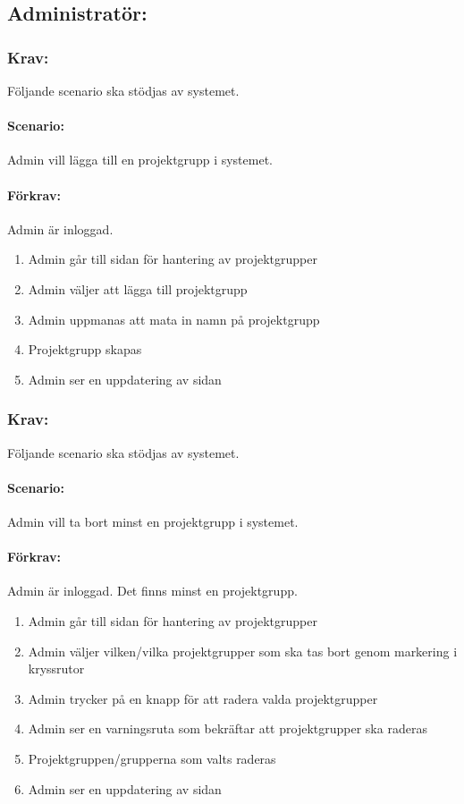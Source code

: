 \documentclass[paper=a4, fontsize=11pt,twoside]{article}
\begin{document}
\subsection{Administratör:}

\subsubsection{Krav:} Följande scenario ska stödjas av systemet.
\paragraph{Scenario:}
Admin vill lägga till en projektgrupp i systemet.
\paragraph{Förkrav:}
Admin är inloggad.
\begin{enumerate}
\item Admin går till sidan för hantering av projektgrupper
\item Admin väljer att lägga till projektgrupp
\item Admin uppmanas att mata in namn på projektgrupp
\item Projektgrupp skapas
\item Admin ser en uppdatering av sidan
\end{enumerate}

\subsubsection{Krav:} 
Följande scenario ska stödjas av systemet.
\paragraph{Scenario:}
Admin vill ta bort minst en projektgrupp i systemet.
\paragraph{Förkrav:}
Admin är inloggad. Det finns minst en projektgrupp.
\begin{enumerate}
\item Admin går till sidan för hantering av projektgrupper
\item Admin väljer vilken/vilka projektgrupper som ska tas bort genom markering i kryssrutor
\item Admin trycker på en knapp för att radera valda projektgrupper
\item Admin ser en varningsruta som bekräftar att projektgrupper ska raderas
\item Projektgruppen/grupperna som valts raderas
\item Admin ser en uppdatering av sidan
\end{enumerate}
\end{document}
